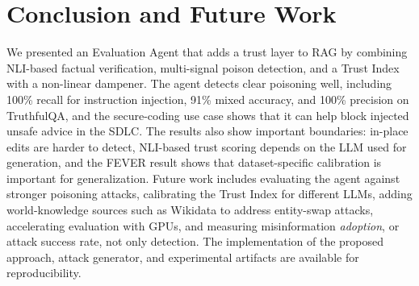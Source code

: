 \section{Conclusion and Future Work}
\label{sec:conclusion}

We presented an Evaluation Agent that adds a trust layer to RAG by combining NLI-based factual verification, multi-signal poison detection, and a Trust Index with a non-linear dampener. The agent detects clear poisoning well, including 100\% recall for instruction injection, 91\% mixed accuracy, and 100\% precision on TruthfulQA, and the secure-coding use case shows that it can help block injected unsafe advice in the SDLC. The results also show important boundaries: in-place edits are harder to detect, NLI-based trust scoring depends on the LLM used for generation, and the FEVER result shows that dataset-specific calibration is important for generalization. Future work includes evaluating the agent against stronger poisoning attacks, calibrating the Trust Index for different LLMs, adding world-knowledge sources such as Wikidata to address entity-swap attacks, accelerating evaluation with GPUs, and measuring misinformation \emph{adoption}, or attack success rate, not only detection. The implementation of the proposed approach, attack generator, and experimental artifacts are available for reproducibility.

